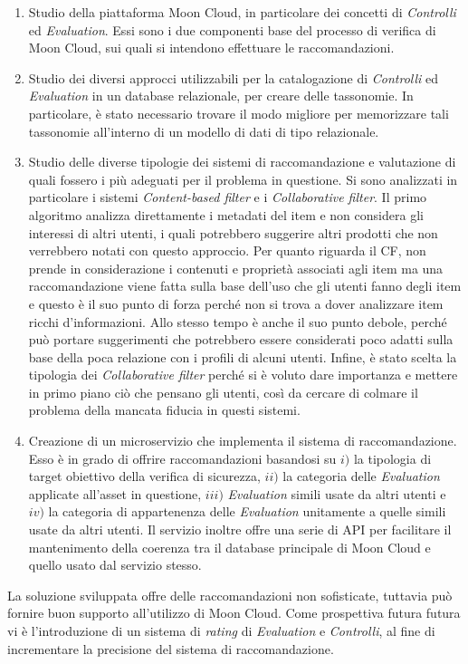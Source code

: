 \documentclass[10pt,a4paper]{article}
\begin{document}
\begin{enumerate}
    \item Studio della piattaforma Moon Cloud, in particolare dei concetti di \textit{Controlli} ed \textit{Evaluation}.
    Essi sono i due componenti base del processo di verifica di Moon Cloud, sui quali si intendono effettuare le raccomandazioni.
    \item Studio dei diversi approcci utilizzabili per la catalogazione di \textit{Controlli} ed \textit{Evaluation} in un database
    relazionale, per creare delle tassonomie. In particolare, è stato necessario trovare il modo migliore per memorizzare tali tassonomie all'interno
    di un modello di dati di tipo relazionale.
    \item Studio delle diverse tipologie dei sistemi di raccomandazione e valutazione di quali fossero i più adeguati per il problema in questione.
    Si sono analizzati in particolare i sistemi \textit{Content-based filter} e i \textit{Collaborative filter}.
    Il primo algoritmo analizza direttamente i metadati del item e non considera gli interessi di altri utenti, i quali potrebbero 
    suggerire altri prodotti che non verrebbero notati con questo approccio.
    Per quanto riguarda il CF, non prende in considerazione i contenuti e proprietà associati agli item ma una raccomandazione 
    viene fatta sulla base dell'uso che gli utenti fanno degli item e questo è il suo punto 
    di forza perché non si trova a dover analizzare item ricchi d’informazioni. Allo stesso tempo è anche il suo punto debole, perché può 
    portare suggerimenti che potrebbero essere considerati poco adatti sulla base della poca relazione con i profili di alcuni utenti. 
    Infine, è stato scelta la tipologia dei \textit{Collaborative filter} perché si è voluto dare importanza e mettere in primo piano ciò che 
    pensano gli utenti, così da cercare di colmare il problema della mancata fiducia in questi sistemi.
    \item Creazione di un microservizio che implementa il sistema di raccomandazione. Esso è in grado di offrire raccomandazioni basandosi
    su $i)$ la tipologia di target obiettivo della verifica di sicurezza, $ii)$ la categoria delle \textit{Evaluation} applicate all’asset in questione, $iii)$ 
    \textit{Evaluation} simili usate da altri utenti e $iv)$ la categoria di appartenenza delle \textit{Evaluation} unitamente a quelle simili usate da altri utenti.
    Il servizio inoltre offre una serie di API per facilitare il mantenimento della coerenza tra il database principale di Moon Cloud e quello
    usato dal servizio stesso.
\end{enumerate}
%
La soluzione sviluppata offre delle raccomandazioni non sofisticate, tuttavia può fornire buon supporto all'utilizzo di Moon Cloud. Come prospettiva futura futura
vi è l'introduzione di un sistema di \textit{rating} di \textit{Evaluation} e \textit{Controlli}, al fine di incrementare la precisione del sistema di raccomandazione.
\end{document}
